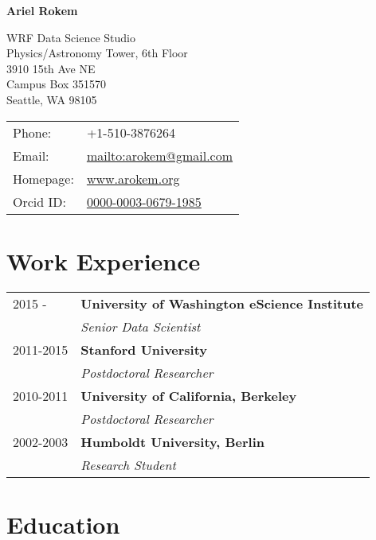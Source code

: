 \documentclass[11pt,fullpage]{article}
\def\name{Ariel Rokem}
\begin{document}
%

\centerline{\Large \bf \name}

\vspace{0.25in}

\begin{minipage}{0.50\linewidth}
  WRF Data Science Studio\\
  Physics/Astronomy Tower, 6th Floor\\
  3910 15th Ave NE\\
  Campus Box 351570\\
  Seattle, WA 98105\\
\end{minipage}
\begin{minipage}{0.50\linewidth}
  \begin{tabular}{ll}
    Phone: & +1-510-3876264 \\
    Email: & \href{mailto:arokem@gmail.com}{mailto:arokem@gmail.com} \\
    Homepage: & \href{http://arokem.org/}{www.arokem.org} \\
    Orcid ID: & \href{http://orcid.org/0000-0003-0679-1985}{0000-0003-0679-1985} \\
  \end{tabular}
\end{minipage}

\section*{Work Experience}
\begin{tabular}{ll}
  2015 -  & {\bf University of Washington eScience Institute}\\
  & \emph{Senior Data Scientist}\\
  2011-2015 & {\bf Stanford University}\\
  & \emph{Postdoctoral Researcher}\\
  2010-2011 & {\bf University of California, Berkeley}\\
  & \emph{Postdoctoral Researcher}\\
  2002-2003 & {\bf Humboldt University, Berlin}\\
  & \emph{Research Student}\\

\end{tabular}

\section*{Education}
\end{document}
